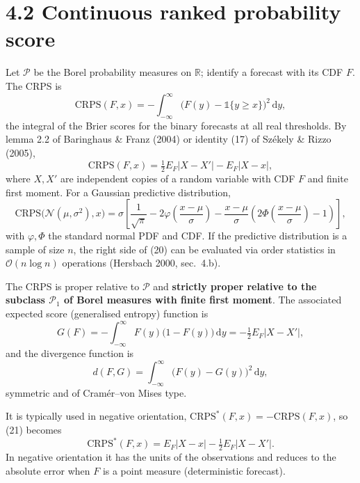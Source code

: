 \documentclass{article}
\newcommand{\1}{\mathbb{1}}
\newcommand{\R}{\mathbb{R}}
\begin{document}
\section*{4.2 Continuous ranked probability score}
Let $\mathcal{P}$ be the Borel probability measures on $\R$; identify a forecast
with its CDF $F$. The CRPS is
\begin{equation}\tag{20}
  \mathrm{CRPS}(F,x) = -\int_{-\infty}^{\infty} \bigl(F(y) - \1\{y\ge x\}\bigr)^2\,\mathrm{d}y ,
\end{equation}
the integral of the Brier scores for the binary forecasts at all real thresholds.
By lemma 2.2 of Baringhaus \& Franz (2004) or identity (17) of Sz\'ekely \&
Rizzo (2005),
\begin{equation}\tag{21}
  \mathrm{CRPS}(F,x) = \tfrac12 E_F|X-X'| - E_F|X-x| ,
\end{equation}
where $X,X'$ are independent copies of a random variable with CDF $F$ and finite
first moment. For a Gaussian predictive distribution,
\[
  \mathrm{CRPS}\bigl(\mathcal{N}(\mu,\sigma^2),x\bigr)
  = \sigma\left[\frac{1}{\sqrt\pi} - 2\varphi\!\left(\frac{x-\mu}{\sigma}\right)
  - \frac{x-\mu}{\sigma}\left(2\Phi\!\left(\frac{x-\mu}{\sigma}\right)-1\right)\right],
\]
with $\varphi,\Phi$ the standard normal PDF and CDF. If the predictive
distribution is a sample of size $n$, the right side of (20) can be evaluated
via order statistics in $\mathcal{O}(n\log n)$ operations (Hersbach 2000, sec.~4.b).

The CRPS is proper relative to $\mathcal{P}$ and \textbf{strictly proper
relative to the subclass $\mathcal{P}_1$ of Borel measures with finite first
moment}. The associated expected score (generalised entropy) function is
\[
  G(F) = -\int_{-\infty}^{\infty} F(y)\bigl(1-F(y)\bigr)\,\mathrm{d}y = -\tfrac12 E_F|X-X'| ,
\]
and the divergence function is
\[
  d(F,G) = \int_{-\infty}^{\infty} \bigl(F(y)-G(y)\bigr)^2\,\mathrm{d}y ,
\]
symmetric and of Cram\'er--von Mises type.

It is typically used in negative orientation, $\mathrm{CRPS}^*(F,x) = -\mathrm{CRPS}(F,x)$,
so (21) becomes
\[
  \mathrm{CRPS}^*(F,x) = E_F|X-x| - \tfrac12 E_F|X-X'| .
\]
In negative orientation it has the units of the observations and reduces to the
absolute error when $F$ is a point measure (deterministic forecast).
\end{document}
